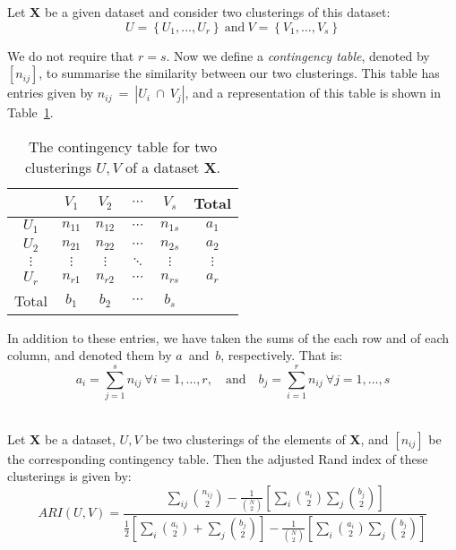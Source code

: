 \begin{definition}\label{def:contingency}
    Let \textbf{X} be a given dataset and consider two clusterings of this
    dataset:
    \[
        U = \left\{U_1, \ldots, U_r\right\}
        \ \text{and} \
        V = \left\{V_1, \ldots, V_s\right\}
    \]

    We do not require that \(r = s\). Now we define a \emph{contingency table},
    denoted by \(\left[n_{ij}\right]\), to summarise the similarity between our
    two clusterings. This table has entries given by
    \(n_{ij}~=~|U_i~\cap~V_j|\), and a representation of this table is shown in
    Table~\ref{tab:contingency}.

    \begin{table}[H]
    \centering
    \begin{tabular}{cccccc}
        {} & \(V_1\) & \(V_2\) & \(\cdots\) & \(V_s\) & Total
        \\ \midrule
        \(U_1\) & \(n_{11}\) & \(n_{12}\) & \(\cdots\) & \(n_{1s}\) & \(a_1\)
        \\
        \(U_2\) & \(n_{21}\) & \(n_{22}\) & \(\cdots\) & \(n_{2s}\) & \(a_2\)
        \\
        \(\vdots\) & \(\vdots\) & \(\vdots\) & \(\ddots\) & \(\vdots\) &
        \(\vdots\)
        \\
        \(U_r\) & \(n_{r1}\) & \(n_{r2}\) & \(\cdots\) & \(n_{rs}\) & \(a_r\)
        \\ \midrule
        Total & \(b_1\) & \(b_2\) & \(\cdots\) & \(b_s\) & {}
    \end{tabular}
    \caption{The contingency table for two clusterings \(U, V\) of a dataset
    \textbf{X}.}\label{tab:contingency}
    \end{table}

    In addition to these entries, we have taken the sums of the each row and of
    each column, and denoted them by \(a\)~and~\(b\), respectively. That is:
    \[
        a_i = \sum_{j=1}^s n_{ij} \ \forall i = 1, \ldots, r, \quad \text{and}
        \quad b_j = \sum_{i=1}^r n_{ij} \ \forall j = 1, \ldots, s
    \]\\
\end{definition}

\begin{definition}\label{def:adjusted-rand-index}
    Let \textbf{X} be a dataset, \(U, V\) be two clusterings of the elements of
    \textbf{X}, and \(\left[n_{ij}\right]\) be the corresponding contingency
    table. Then the adjusted Rand index of these clusterings is given by:
    \[
        ARI(U, V) = \frac{\displaystyle{\sum_{ij} {n_{ij}\choose 2} -
        \frac{1}{{N\choose 2}}\left[\sum_i {a_i\choose 2}\sum_j {b_j\choose
        2}\right]}}{\displaystyle{\frac{1}{2} \left[\sum_i {a_i\choose 2} +
        \sum_j{b_j\choose 2}\right] - \frac{1}{{N\choose 2}}\left[\sum_i
        {a_i\choose 2}\sum_j {b_j\choose 2}\right]}}
    \]
\end{definition}

